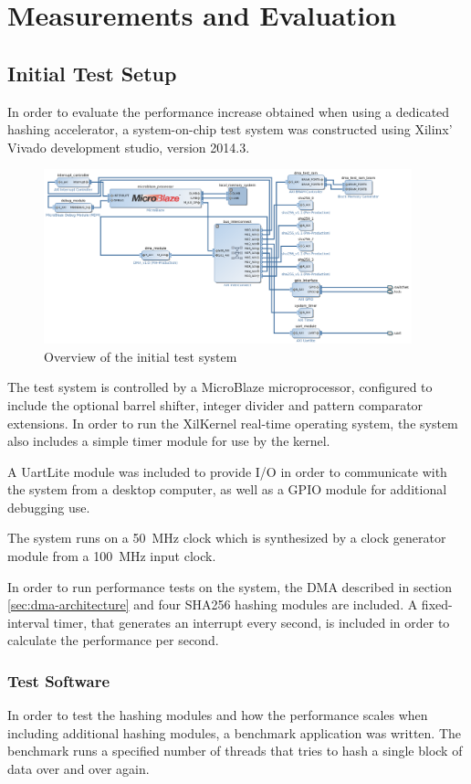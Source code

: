 \chapter{Measurements and Evaluation}

\section{Initial Test Setup}
In order to evaluate the performance increase obtained when using a dedicated
hashing accelerator, a system-on-chip test system was constructed using Xilinx' Vivado
development studio, version 2014.3.

\begin{figure}[ht]
	\includegraphics[width=0.95\textwidth]{Figures/testsystem-vivado.png}
	\caption{Overview of the initial test system}
	\label{fig:testsystem-vivado}
\end{figure}

The test system is controlled by a MicroBlaze microprocessor, configured to
include the optional barrel shifter, integer divider and pattern comparator extensions.
In order to run the XilKernel real-time operating system, the system also
includes a simple timer module for use by the kernel.

A UartLite module was included to provide I/O in order to communicate with
the system from a desktop computer, as well as a GPIO module for additional
debugging use.

The system runs on a 50~MHz clock which is synthesized by a clock generator
module from a 100~MHz input clock.

In order to run performance tests on the system, the DMA described in
section \ref{sec:dma-architecture} and four
SHA256 hashing modules are included.
A fixed-interval timer, that generates an interrupt every second, is
included in order to calculate the performance per second.

\subsection{Test Software}
In order to test the hashing modules and how the performance scales when including
additional hashing modules, a benchmark application was written. The benchmark
runs a specified number of threads that tries to hash a single block of data
over and over again.

